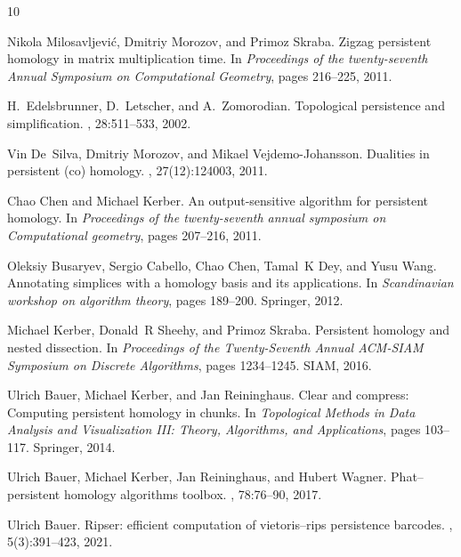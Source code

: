 \documentclass[10pt,a4paper]{article}
\begin{document}
\begin{thebibliography}{10}

Nikola Milosavljevi{\'c}, Dmitriy Morozov, and Primoz Skraba.
\newblock Zigzag persistent homology in matrix multiplication time.
\newblock In {\em Proceedings of the twenty-seventh Annual Symposium on Computational Geometry}, pages 216--225, 2011.

H.~Edelsbrunner, D.~Letscher, and A.~Zomorodian.
\newblock Topological persistence and simplification.
, 28:511--533, 2002.

Vin De~Silva, Dmitriy Morozov, and Mikael Vejdemo-Johansson.
\newblock Dualities in persistent (co) homology.
, 27(12):124003, 2011.

Chao Chen and Michael Kerber.
\newblock An output-sensitive algorithm for persistent homology.
\newblock In {\em Proceedings of the twenty-seventh annual symposium on Computational geometry}, pages 207--216, 2011.

Oleksiy Busaryev, Sergio Cabello, Chao Chen, Tamal~K Dey, and Yusu Wang.
\newblock Annotating simplices with a homology basis and its applications.
\newblock In {\em Scandinavian workshop on algorithm theory}, pages 189--200. Springer, 2012.

Michael Kerber, Donald~R Sheehy, and Primoz Skraba.
\newblock Persistent homology and nested dissection.
\newblock In {\em Proceedings of the Twenty-Seventh Annual ACM-SIAM Symposium on Discrete Algorithms}, pages 1234--1245. SIAM, 2016.

Ulrich Bauer, Michael Kerber, and Jan Reininghaus.
\newblock Clear and compress: Computing persistent homology in chunks.
\newblock In {\em Topological Methods in Data Analysis and Visualization III: Theory, Algorithms, and Applications}, pages 103--117. Springer, 2014.

Ulrich Bauer, Michael Kerber, Jan Reininghaus, and Hubert Wagner.
\newblock Phat--persistent homology algorithms toolbox.
, 78:76--90, 2017.

Ulrich Bauer.
\newblock Ripser: efficient computation of vietoris--rips persistence barcodes.
, 5(3):391--423, 2021.


\end{thebibliography}
\end{document}
